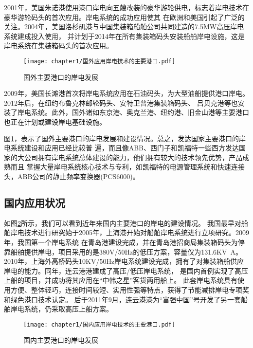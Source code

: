 2001年，美国朱诺港使用港口岸电向五艘改装的豪华游轮供电，标志着岸电技术在豪华游轮码头的首次应用。岸电系统的成功应用使其
在欧洲和美国引起了广泛的关注。2004年，美国洛杉矶港与中国集装箱船舶公司共同建造的7.5\si{MW}高压岸电系统建成投入使用\cite{SP5}，
并计划于2014年在所有集装箱码头安装船舶岸电设施，这是岸电系统在集装箱码头的首次应用。

\begin{figure}[!htp]
	\centering
	\texttt{[image: chapter1/国外应用岸电技术的主要港口.pdf]}
	\caption{国外主要港口的岸电发展}
	\label{fig:国外主要港口的岸电发展}
\end{figure}

2009年，美国长滩港首次将岸电系统应用在石油码头，为大型油船提供港口岸电。2012年后，在纽约布鲁克林邮轮码头、安特卫普港集装箱码头、
吕贝克港等也安装了岸电系统。此外，国外诸如东京港、奥克兰港、纽约港、旧金山港等主要港口也正在计划或建设岸电基础设施\cite{SP6}。

图\ref{fig:国外主要港口的岸电发展}，表示了国外主要港口的岸电发展和建设情况。总之，发达国家主要港口的岸电系统建设和应用已经比较普
遍，而且像ABB、西门子和凯福特一些西方发达国家的大公司拥有岸电系统总体建设的能力，他们拥有较大的技术领先优势，产品成熟而且
掌握大量岸电系统核心技术与专利，如凯福特的电源管理系统和快速连接头，ABB公司的静止频率变换器(PCS6000)\cite{SP5}。

\subsection{国内应用状况}

如图\ref{fig:国内主要港口的岸电发展}所示，我们可以看到近年来国内主要港口的岸电的建设情况。
我国最早对船舶岸电技术进行研究始于2005年，上海港开始对船舶岸电系统进行立项研究。2009年，我国第一个岸电系统
在青岛港建设完成，并在青岛港招商局集装箱码头为停靠船舶提供岸电，项目采用的是380V/50Hz的低压方案，容量仅为131.6\si{KV.A}。
2010年，上海外高桥码头10KV/50Hz岸电系统建设完成，拥有了对集装箱船供应岸电的能力。同年，连云港港建成了高压/低压岸电系统，
是国内首例实现了高压上船的项目，并成功将其应用在“中韩之星”客货两用船上\cite{SP4}。
此套岸电系统具有使用方便、整体轻巧，连接时间较短、实用性强等特点，获得了节能减排岸电专项奖和绿色港口技术认定\cite{SP8}。
后于2011年9月，连云港港为“富强中国”号开发了另一套船舶岸电系统，仍采取高压上船方案。

\begin{figure}[!htp]
	\centering
	\texttt{[image: chapter1/国内应用岸电技术的主要港口.pdf]}
	\caption{国内主要港口的岸电发展}
	\label{fig:国内主要港口的岸电发展}
\end{figure}

